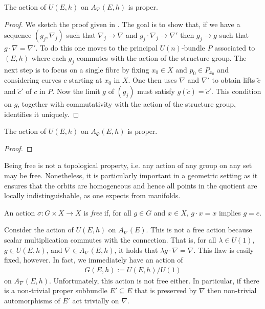 \documentclass[12pt]{ociamthesis}  %
\begin{document}
\begin{example}\label{ex:h_proper_action}
  The action of $U(E,h)$ on $A_\nabla(E,h)$ is proper.
  \begin{proof}
    We sketch the proof given in
    \cite[{Proposition 7.1.14}]{kobayashi1987}.
    The goal is to show that, if we have a sequence $(g_j,\nabla_j)$
    such that $\nabla_j\to\nabla$ and $g_j\cdot\nabla_j\to\nabla'$
    then $g_j\to g$ such that $g\cdot\nabla = \nabla'$. To do this
    one moves to the principal $U(n)$-bundle $P$ associated to $(E,h)$
    where each $g_j$ commutes with the action of the structure
    group. The next step is to focus on a single fibre by fixing $x_0\in X$ and
    $p_0\in P_{x_0}$ and considering curves $c$ starting at $x_0$ in $X$.
    One then uses $\nabla$ and $\nabla'$ to obtain lifts $\tilde c$ and
    $\tilde c'$ of $c$ in $P$. Now the limit $g$ of $(g_j)$ must satisfy
    $g(\tilde c) = \tilde c'$. This condition on $g$, together with
    commutativity with the action of the structure group, identifies it
    uniquely.
  \end{proof}
\end{example}

\begin{example}\label{ex:higgs_proper_action}
  The action of $U(E,h)$ on $A_\Phi (E,h)$ is proper.
  \begin{proof}
    \missingproof
  \end{proof}
\end{example}

Being free is not a topological property, i.e. any action of any group on any
set may be free. Nonetheless, it is particularly important in a geometric
setting as it ensures that the orbits are homogeneous and hence all points in
the quotient are locally indistinguishable, as one expects from manifolds.

\begin{definition}
  An action $\sigma : G\times X\to X$ is \emph{free} if, for all
  $g\in G$ and $x\in X$, $g\cdot x = x$ implies $g = e$.
\end{definition}

\begin{example}\label{ex:not_free}
  Consider the action of $U(E,h)$ on $A_\nabla(E)$. This is not a free action
  because scalar multiplication commutes with the connection. That is,
  for all $\lambda\in U(1)$, $g\in U(E,h)$, and $\nabla\in A_\nabla(E,h)$,
  it holds that $\lambda g\cdot \nabla = \nabla$. This flaw is easily fixed,
  however. In fact, we immediately have an action of
  \begin{align*}
    G(E,h) := U(E,h) / U(1)
  \end{align*}
  on $A_\nabla(E,h)$. Unfortunately, this action is not free either. In particular,
  if there is a non-trivial proper subbundle $E'\subseteq E$ that is preserved
  by $\nabla$ then non-trivial automorphisms of $E'$ act trivially on $\nabla$.
\end{example}
\end{document}
